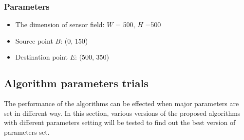 \documentclass[final]{elsarticle}
\begin{document}
\begin{table}
	\caption{Experimental instances for homogeneous network using attenuated model (Data set 2)}
	\label{tab2}       %
	\begin{center}
		\renewcommand{\arraystretch}{1.5}
	\end{center}
\end{table}
\subsubsection{Parameters}
\begin{itemize}
	\item The dimension of sensor field: $ W $ = 500, $ H $ =500
	\item Source point $ B $: (0, 150) 
	\item Destination point $ E $: (500, 350)	
\end{itemize}
\subsection{Algorithm parameters trials}
The performance of the algorithms can be effected when major parameters are set in different way. In this section, various versions of the proposed algorithms with different parameters setting will be tested to find out the best version of parameters set.
\end{document}
